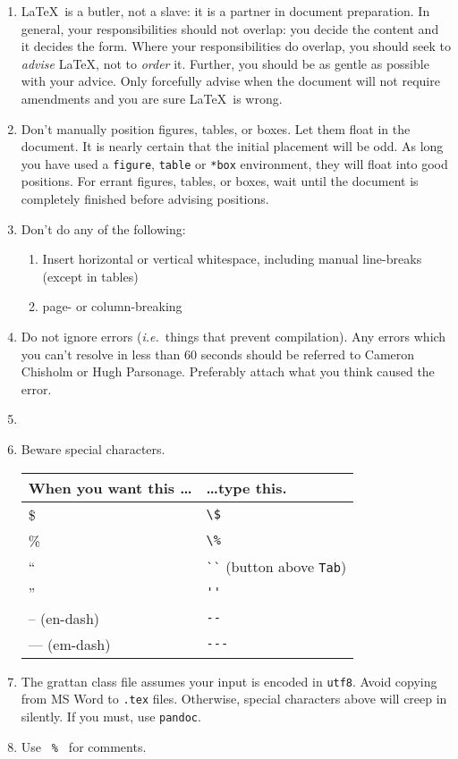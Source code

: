 \documentclass[a4paper,11pt]{scrartcl}\usepackage[]{graphicx}\usepackage[]{color}
\begin{document}
\begin{enumerate}
  \item \LaTeX\ is a butler, not a slave: it is a partner in document preparation. In general, your responsibilities should not overlap: you decide the content and it decides the form. Where your responsibilities do overlap, you should seek to \emph{advise} \LaTeX, not to \emph{order} it. Further, you should be as gentle as possible with your advice. Only forcefully advise when the document will not require amendments and you are sure \LaTeX\ is wrong. 
  \item Don't manually position figures, tables, or boxes. Let them float in the document. It is nearly certain that the initial placement will be odd. As long you have used a \verb=figure=, \verb=table= or \verb=*box= environment, they will float into good positions. For errant figures, tables, or boxes, wait until the document is completely finished before advising positions.
  \item Don't do any of the following:
  \begin{enumerate}
   \item Insert horizontal or vertical whitespace, including manual line-breaks (except in tables)
   \item page- or column-breaking
  \end{enumerate}
  \item Do not ignore errors (\emph{i.e.}~things that prevent compilation). Any errors which you can't resolve in less than 60 seconds should be referred to Cameron Chisholm or Hugh Parsonage. Preferably attach what you think caused the error.
  \item 

  \item Beware special characters. 
  \begin{table}[h]
   \centering
   \begin{tabular}{ll}
   \toprule
   \textbf{When you want this \dots} & \textbf{\dots type this.} \\
   \midrule
   \$ & \verb=\$= \\
   \% & \verb=\%= \\
   `` & \verb=``= (button above \verb=Tab=) \\
   '' & \verb=''= \\
   -- (en-dash) & \verb=--=  \\
   --- (em-dash) & \verb=---=  \\
   \bottomrule   
  \end{tabular}
  \end{table}

  


  \item The grattan class file assumes your input is encoded in \texttt{utf8}. Avoid copying from MS Word to \verb=.tex= files. Otherwise, special characters above will creep in silently. If you must, use \verb=pandoc=.
  \item Use \verb= % = for comments.
 \end{enumerate}
\end{document}
